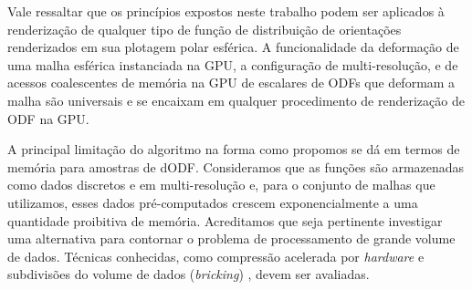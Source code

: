 \documentclass[
    12pt,                %
    oneside,            %
    a4paper,            %
    english,            %
    french,                %
    spanish,            %
    brazil                %
    ]{abntex2}
\begin{document}
Vale ressaltar que os princípios expostos neste trabalho podem ser aplicados à renderização de qualquer tipo de função de distribuição de orientações renderizados em sua plotagem polar esférica. A funcionalidade da deformação de uma malha esférica instanciada na GPU, a configuração de multi-resolução, e de acessos coalescentes de memória na GPU de escalares de ODFs que deformam a malha são universais e se encaixam em qualquer procedimento de renderização de ODF na GPU.


A principal limitação  do algoritmo na forma como propomos se dá em termos de memória para amostras de dODF. Consideramos que as funções são armazenadas como dados discretos e em multi-resolução e, para o conjunto de malhas que utilizamos, esses dados pré-computados crescem exponencialmente a uma quantidade proibitiva de memória. Acreditamos que seja pertinente investigar uma alternativa para contornar o problema de processamento de grande volume de dados. Técnicas conhecidas, como compressão acelerada por \textit{hardware} \cite{sakharnykh2020} e subdivisões do volume de dados (\textit{bricking}) \cite{Beyer2014}, devem ser avaliadas.


\end{document}
